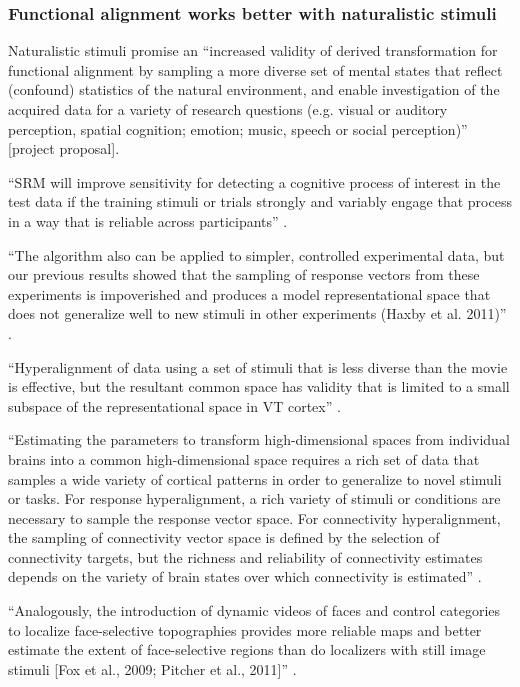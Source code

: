 \subsubsection{Functional alignment works better with naturalistic stimuli}

%
Naturalistic stimuli promise an ``increased validity of derived transformation
for functional alignment by sampling a more diverse set of mental states that
reflect (confound) statistics of the natural environment, and enable
investigation of the acquired data for a variety of research questions (e.g.
visual or auditory perception, spatial cognition; emotion; music, speech or
social perception)'' [project proposal].



``SRM will improve sensitivity for detecting a cognitive process of interest in
the test data if the training stimuli or trials strongly and variably engage
that process in a way that is reliable across participants''
\citep{cohen2017computational}.

%
``The algorithm also can be applied to simpler, controlled experimental data,
but our previous results showed that the sampling of response vectors from these
experiments is impoverished and produces a model representational space that
does not generalize well to new stimuli in other experiments (Haxby et al.
2011)'' \citep{guntupalli2016model}.

%
``Hyperalignment of data using a set of stimuli that is less diverse than the
movie is effective, but the resultant common space has validity that is limited
to a small subspace of the representational space in VT cortex''
\citep{haxby2011common}.

%
``Estimating the parameters to transform high-dimensional spaces from individual
brains into a common high-dimensional space requires a rich set of data that
samples a wide variety of cortical patterns in order to generalize to novel
stimuli or tasks.
%
For response hyperalignment, a rich variety of stimuli or conditions are
necessary to sample the response vector space.
%
For connectivity hyperalignment, the sampling of connectivity vector space is
defined by the selection of connectivity targets, but the richness and
reliability of connectivity estimates depends on the variety of brain states
over which connectivity is estimated'' \citep{haxby2020hyperalignment}.


%
``Analogously, the introduction of dynamic videos of faces and control
categories to localize face-selective topographies provides more reliable maps
and better estimate the extent of face-selective regions than do localizers with
still image stimuli [Fox et al., 2009; Pitcher et al., 2011]''
\citep{jiahui2020predicting}.




